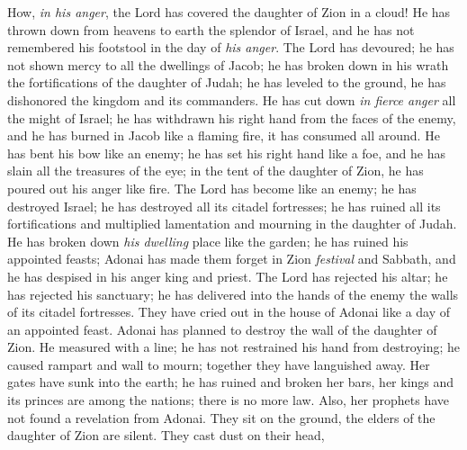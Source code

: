 \begin{biblechapter} %
 How, \textit{in his anger}, 
the Lord has covered the daughter of Zion in a cloud! 
He has thrown down from heavens to earth 
the splendor of Israel, 
and he has not remembered his footstool 
in the day of \textit{his anger}.
\verse The Lord has devoured; he has not shown mercy 
to all the dwellings of Jacob; 
he has broken down in his wrath 
the fortifications of the daughter of Judah; 
he has leveled to the ground, he has dishonored 
the kingdom and its commanders.
\verse He has cut down \textit{in fierce anger} 
all the might of Israel; 
he has withdrawn his right hand 
from the faces of the enemy, 
and he has burned in Jacob like a flaming fire, 
it has consumed all around.
\verse He has bent his bow like an enemy; 
he has set his right hand 
like a foe, and he has slain 
all the treasures of the eye; 
in the tent of the daughter of Zion, 
he has poured out his anger like fire.
\verse The Lord has become like an enemy; 
he has destroyed Israel; 
he has destroyed all its citadel fortresses; 
he has ruined all its fortifications 
and multiplied lamentation and mourning 
in the daughter of Judah.
\verse He has broken down \textit{his dwelling} place like the garden; 
he has ruined his appointed feasts; 
Adonai has made them forget in Zion 
\textit{festival} and Sabbath, 
and he has despised in his anger 
king and priest.
\verse The Lord has rejected his altar; 
he has rejected his sanctuary; 
he has delivered into the hands of the enemy 
the walls of its citadel fortresses. 
They have cried out in the house of Adonai 
like a day of an appointed feast.
\verse Adonai has planned to destroy 
the wall of the daughter of Zion. 
He measured with a line; he has not restrained 
his hand from destroying; 
he caused rampart and wall to mourn; 
together they have languished away.
\verse Her gates have sunk into the earth; 
he has ruined and broken her bars, 
her kings and its princes are among the nations; 
there is no more law. 
Also, her prophets have not found 
a revelation from Adonai.
\verse They sit on the ground, 
the elders of the daughter of Zion are silent. 
They cast dust on their head, 

\end{biblechapter}
